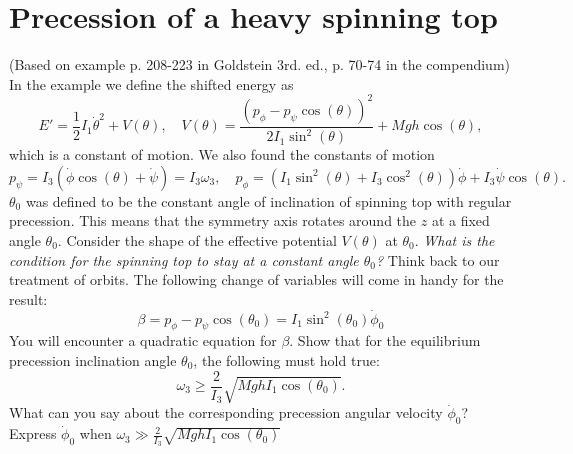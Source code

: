 \documentclass{article}
\begin{document}
    \section{Precession of a heavy spinning top}
        (Based on example p. 208-223 in Goldstein 3rd. ed., p. 70-74 in the compendium)\\
        In the example we define the shifted energy as 
        \begin{equation*}
            E' = \frac{1}{2}I_1 \dot \theta^2 + V(\theta), \quad V(\theta) = \frac{(p_\phi - p_\psi \cos(\theta))^2}{2I_1\sin^2(\theta)} + Mgh\cos(\theta),
        \end{equation*}
        which is a constant of motion. We also found the constants of motion 
        \begin{equation*}
            p_\psi =  I_3(\dot \phi \cos(\theta) + \dot \psi) = I_3 \omega_3, \quad
            p_\phi = (I_1 \sin^2(\theta) + I_3 \cos^2(\theta)) \dot \phi + I_3 \dot \psi \cos(\theta).
        \end{equation*}
        $\theta_0$ was defined to be the constant angle of inclination of spinning top with regular precession. This means that the symmetry axis rotates around the $z$ at a fixed angle $\theta_0$. Consider the shape of the effective potential $V(\theta)$ at $\theta_0$. \emph{What is the condition for the spinning top to stay at a constant angle $\theta_0$?} Think back to our treatment of orbits. The following change of variables will come in handy for the result:
        \begin{equation*}
            \beta = p_\phi - p_\psi \cos(\theta_0) = I_1 \sin^2(\theta_0) \dot \phi_0
        \end{equation*}
        You will encounter a quadratic equation for $\beta$. Show that for the equilibrium precession inclination angle $\theta_0$, the following must hold true:
        \begin{equation*}
            \omega_3 \ge \frac{2}{I_3}\sqrt{MghI_1 \cos(\theta_0) }.
        \end{equation*}
        What can you say about the corresponding precession angular velocity $\dot \phi_0$? Express $\dot \phi_0$ when $\omega_3 \gg \frac{2}{I_3}\sqrt{MghI_1 \cos(\theta_0) }$
\end{document}
